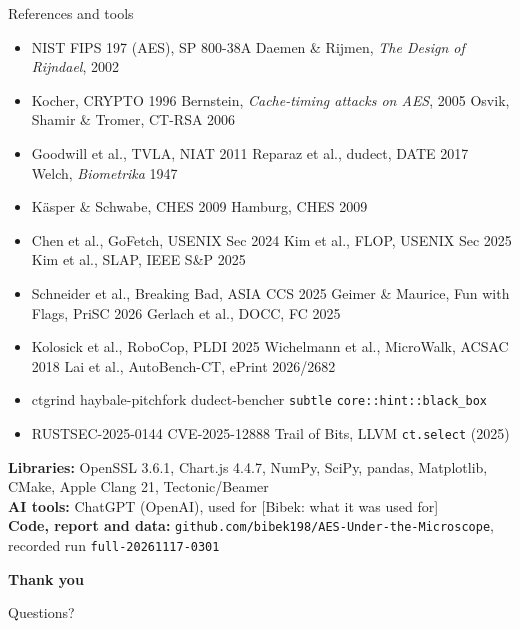\documentclass[aspectratio=169,11pt]{beamer}
\newcommand{\code}[1]{\texttt{#1}}
\begin{document}
\begin{frame}{References and tools}
\tiny
\begin{itemize}
  \item NIST FIPS 197 (AES), SP 800-38A \textbullet{} Daemen \& Rijmen, \emph{The Design of Rijndael}, 2002
  \item Kocher, CRYPTO 1996 \textbullet{} Bernstein, \emph{Cache-timing attacks on AES}, 2005 \textbullet{} Osvik, Shamir \& Tromer, CT-RSA 2006
  \item Goodwill et al., TVLA, NIAT 2011 \textbullet{} Reparaz et al., dudect, DATE 2017 \textbullet{} Welch, \emph{Biometrika} 1947
  \item Käsper \& Schwabe, CHES 2009 \textbullet{} Hamburg, CHES 2009
  \item Chen et al., GoFetch, USENIX Sec 2024 \textbullet{} Kim et al., FLOP, USENIX Sec 2025 \textbullet{} Kim et al., SLAP, IEEE S\&P 2025
  \item Schneider et al., Breaking Bad, ASIA CCS 2025 \textbullet{} Geimer \& Maurice, Fun with Flags, PriSC 2026 \textbullet{} Gerlach et al., DOCC, FC 2025
  \item Kolosick et al., RoboCop, PLDI 2025 \textbullet{} Wichelmann et al., MicroWalk, ACSAC 2018 \textbullet{} Lai et al., AutoBench-CT, ePrint 2026/2682
  \item ctgrind \textbullet{} haybale-pitchfork \textbullet{} dudect-bencher \textbullet{} \code{subtle} \textbullet{} \code{core::hint::black\_box}
  \item RUSTSEC-2025-0144 \textbullet{} CVE-2025-12888 \textbullet{} Trail of Bits, LLVM \code{ct.select} (2025)
\end{itemize}
\vspace{0.2cm}
\scriptsize
\textbf{Libraries:} OpenSSL 3.6.1, Chart.js 4.4.7, NumPy, SciPy, pandas, Matplotlib, CMake, Apple Clang 21, Tectonic/Beamer\\
\textbf{AI tools:} ChatGPT (OpenAI), used for [Bibek: what it was used for]\\
\textbf{Code, report and data:} \code{github.com/bibek198/AES-Under-the-Microscope}, recorded run \code{full-20261117-0301}
\end{frame}

{
\begin{frame}[plain]
\centering\color{white}\vfill
{\Huge\bfseries Thank you}\par\vspace{0.3cm}
{\large Questions?}\par\vfill
\end{frame}}
\end{document}
